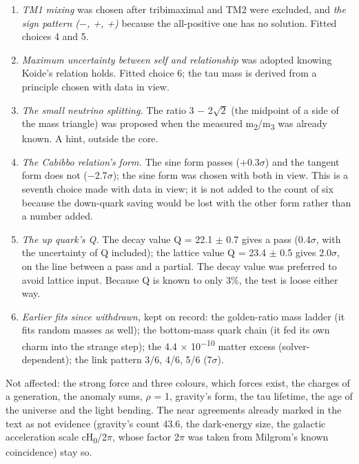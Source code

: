 \documentclass[
  11pt,
]{article}
\begin{document}
\begin{enumerate}
\item
  \emph{TM1 mixing} was chosen after tribimaximal and TM2 were excluded, and \emph{the sign pattern (\ensuremath{-}, +, +)} because the all-positive one has no solution. Fitted choices 4 and 5.
\item
  \emph{Maximum uncertainty between self and relationship} was adopted knowing Koide's relation holds. Fitted choice 6; the tau mass is derived from a principle chosen with data in view.
\item
  \emph{The small neutrino splitting.} The ratio 3 \ensuremath{-} 2\ensuremath{\sqrt{2}} (the midpoint of a side of the mass triangle) was proposed when the measured m\textsubscript{2}/m\textsubscript{3} was already known. A hint, outside the core.
\item
  \emph{The Cabibbo relation's form.} The sine form passes (+0.3\ensuremath{\sigma}) and the tangent form does not (\ensuremath{-}2.7\ensuremath{\sigma}); the sine form was chosen with both in view. This is a seventh choice made with data in view; it is not added to the count of six because the down-quark saving would be lost with the other form rather than a number added.
\item
  \emph{The up quark's Q.} The decay value Q = 22.1 \ensuremath{\pm} 0.7 gives a pass (0.4\ensuremath{\sigma}, with the uncertainty of Q included); the lattice value Q = 23.4 \ensuremath{\pm} 0.5 gives 2.0\ensuremath{\sigma}, on the line between a pass and a partial. The decay value was preferred to avoid lattice input. Because Q is known to only 3\%, the test is loose either way.
\item
  \emph{Earlier fits since withdrawn,} kept on record: the golden-ratio mass ladder (it fits random masses as well); the bottom-mass quark chain (it fed its own charm into the strange step); the 4.4 \ensuremath{\times} 10\textsuperscript{\ensuremath{-}10} matter excess (solver-dependent); the link pattern 3/6, 4/6, 5/6 (7\ensuremath{\sigma}).
\end{enumerate}

Not affected: the strong force and three colours, which forces exist, the charges of a generation, the anomaly sums, \ensuremath{\rho} = 1, gravity's form, the tau lifetime, the age of the universe and the light bending. The near agreements already marked in the text as not evidence (gravity's count 43.6, the dark-energy size, the galactic acceleration scale cH\textsubscript{0}/2\ensuremath{\pi}, whose factor 2\ensuremath{\pi} was taken from Milgrom's known coincidence) stay so.
\end{document}
